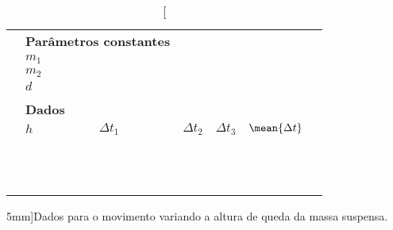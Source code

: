 \begin{table*}[!ht]
\centering
\begin{tabular}{lp{25mm}p{25mm}p{25mm}p{25mm}p{25mm}l}
\toprule
	& \multicolumn{2}{l}{\textbf{Parâmetros constantes}} & \\
	\cmidrule{2-3}
	& $m_1$ \cellcolor[gray]{0.89} & \cellcolor[gray]{0.92} \\
	& $m_2$ \cellcolor[gray]{0.95} & \cellcolor[gray]{0.97} \\
	& $d$ \cellcolor[gray]{0.89} & \cellcolor[gray]{0.92} \\
	\cmidrule{2-3}
\\
	& \multicolumn{2}{l}{\textbf{Dados}} \\
	\cmidrule{2-6}
	& $h$ & $\Delta t_1$ & $\Delta t_2$ & $\Delta t_3$ & $\mean{\Delta t}$ & \\
	\cmidrule{2-6}
	& \cellcolor[gray]{0.89} & \cellcolor[gray]{0.92} & \cellcolor[gray]{0.89} & \cellcolor[gray]{0.92} & \cellcolor[gray]{0.89} \\
	& \cellcolor[gray]{0.95} & \cellcolor[gray]{0.97} & \cellcolor[gray]{0.95} & \cellcolor[gray]{0.97} & \cellcolor[gray]{0.95} \\
		& \cellcolor[gray]{0.89} & \cellcolor[gray]{0.92} & \cellcolor[gray]{0.89} & \cellcolor[gray]{0.92} & \cellcolor[gray]{0.89} \\
	& \cellcolor[gray]{0.95} & \cellcolor[gray]{0.97} & \cellcolor[gray]{0.95} & \cellcolor[gray]{0.97} & \cellcolor[gray]{0.95} \\
		& \cellcolor[gray]{0.89} & \cellcolor[gray]{0.92} & \cellcolor[gray]{0.89} & \cellcolor[gray]{0.92} & \cellcolor[gray]{0.89} \\
	& \cellcolor[gray]{0.95} & \cellcolor[gray]{0.97} & \cellcolor[gray]{0.95} & \cellcolor[gray]{0.97} & \cellcolor[gray]{0.95} \\
		& \cellcolor[gray]{0.89} & \cellcolor[gray]{0.92} & \cellcolor[gray]{0.89} & \cellcolor[gray]{0.92} & \cellcolor[gray]{0.89} \\
	& \cellcolor[gray]{0.95} & \cellcolor[gray]{0.97} & \cellcolor[gray]{0.95} & \cellcolor[gray]{0.97} & \cellcolor[gray]{0.95} \\
		& \cellcolor[gray]{0.89} & \cellcolor[gray]{0.92} & \cellcolor[gray]{0.89} & \cellcolor[gray]{0.92} & \cellcolor[gray]{0.89} \\
	& \cellcolor[gray]{0.95} & \cellcolor[gray]{0.97} & \cellcolor[gray]{0.95} & \cellcolor[gray]{0.97} & \cellcolor[gray]{0.95} \\
		& \cellcolor[gray]{0.89} & \cellcolor[gray]{0.92} & \cellcolor[gray]{0.89} & \cellcolor[gray]{0.92} & \cellcolor[gray]{0.89} \\
	& \cellcolor[gray]{0.95} & \cellcolor[gray]{0.97} & \cellcolor[gray]{0.95} & \cellcolor[gray]{0.97} & \cellcolor[gray]{0.95} \\
	\cmidrule{2-6}
\bottomrule
\end{tabular}
\caption[][5mm]{Dados para o movimento variando a altura de queda da massa suspensa.}
\label{TabelaDadosEnergiaMecanica3}
\end{table*}
